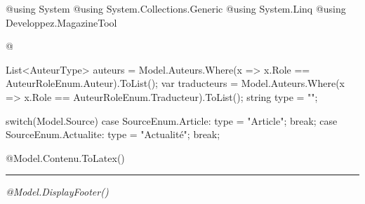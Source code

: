 @using System
@using System.Collections.Generic
@using System.Linq
@using Developpez.MagazineTool

@{
	List<AuteurType> auteurs = Model.Auteurs.Where(x => x.Role == AuteurRoleEnum.Auteur).ToList();
	var traducteurs = Model.Auteurs.Where(x => x.Role == AuteurRoleEnum.Traducteur).ToList();
	string type = "";

	switch(Model.Source)
	{
		case SourceEnum.Article:
			type = "Article";
			break;
		case SourceEnum.Actualite:
			type = "Actualité";
			break;
	}
}

\label{article-@Model.ID}


@Model.Contenu.ToLatex()
\begin{center}
\rule{\linewidth}{.5pt}

\emph{@Model.DisplayFooter()}

\end{center}